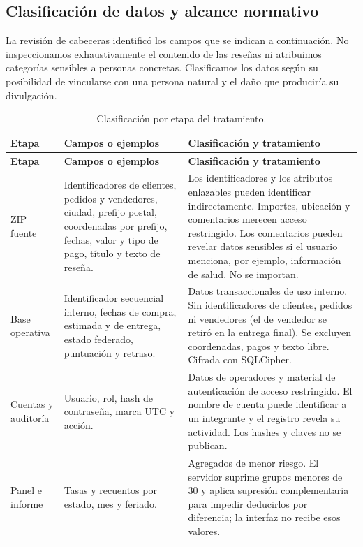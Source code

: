 \subsection{Clasificación de datos y alcance normativo}
\label{sec:clasificacion}
La revisión de cabeceras identificó los campos que se indican a continuación. No inspeccionamos exhaustivamente el contenido de las reseñas ni atribuimos categorías sensibles a personas concretas. Clasificamos los datos según su posibilidad de vincularse con una persona natural y el daño que produciría su divulgación.

{\small
\begin{longtable}{@{}P{.16\textwidth}P{.40\textwidth}P{.37\textwidth}@{}}
\caption{Clasificación por etapa del tratamiento.}\\
\toprule
\textbf{Etapa} & \textbf{Campos o ejemplos} & \textbf{Clasificación y tratamiento}\\
\midrule
\endfirsthead
\toprule
\textbf{Etapa} & \textbf{Campos o ejemplos} & \textbf{Clasificación y tratamiento}\\
\midrule
\endhead
ZIP fuente & Identificadores de clientes, pedidos y vendedores, ciudad, prefijo postal, coordenadas por prefijo, fechas, valor y tipo de pago, título y texto de reseña. & Los identificadores y los atributos enlazables pueden identificar indirectamente. Importes, ubicación y comentarios merecen acceso restringido. Los comentarios pueden revelar datos sensibles si el usuario menciona, por ejemplo, información de salud. No se importan.\\
Base operativa & Identificador secuencial interno, fechas de compra, estimada y de entrega, estado federado, puntuación y retraso. & Datos transaccionales de uso interno. Sin identificadores de clientes, pedidos ni vendedores (el de vendedor se retiró en la entrega final). Se excluyen coordenadas, pagos y texto libre. Cifrada con SQLCipher.\\
Cuentas y auditoría & Usuario, rol, hash de contraseña, marca UTC y acción. & Datos de operadores y material de autenticación de acceso restringido. El nombre de cuenta puede identificar a un integrante y el registro revela su actividad. Los hashes y claves no se publican.\\
Panel e informe & Tasas y recuentos por estado, mes y feriado. & Agregados de menor riesgo. El servidor suprime grupos menores de 30 y aplica supresión complementaria para impedir deducirlos por diferencia; la interfaz no recibe esos valores.\\
\bottomrule
\end{longtable}
}

